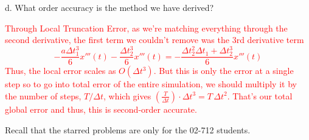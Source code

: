 \documentclass[11pt]{article}
\begin{document}
d. What order accuracy is the method we have derived?

\textcolor{red}{
Through Local Truncation Error, as we're matching everything through the second derivative, the first term we couldn't remove was the 3rd derivative term
\[-\frac{a \Delta t_1^3}{6} x'''(t) - \frac{\Delta t_2^3}{6} x'''(t) = -\frac{\Delta t_2^2 \Delta t_1 + \Delta t_2^3}{6} x'''(t)\]
Thus, the local error scales as $O(\Delta t^3)$. But this is only the error at a single step so to go into total error of the entire simulation, we should multiply it by the number of steps, $T/\Delta t$, which gives $\left( \frac{T}{\Delta t} \right) \cdot \Delta t^3 = T\,\Delta t^2$. That's our total global error and thus, this is second-order accurate.
}

{\bf *}Recall that the starred problems are only for the 02-712 students.
\end{document}
